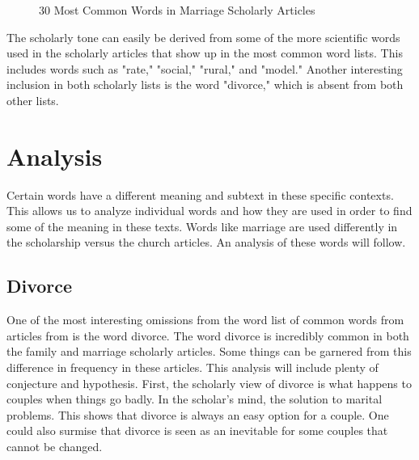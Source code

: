 \documentclass[twocolumn]{article}
\begin{document}
\begin{figure}[h]
    \centering
    \caption{30 Most Common Words in Marriage Scholarly Articles}
    \label{fig:mswc}
\end{figure}

The scholarly tone can easily be derived from some of the more scientific words used in the scholarly articles that show up in the most common word lists. This includes words such as "rate," "social," "rural," and "model." Another interesting inclusion in both scholarly lists is the word "divorce," which is absent from both other lists.

\section{Analysis}

Certain words have a different meaning and subtext in these specific contexts. This allows us to analyze individual words and how they are used in order to find some of the meaning in these texts. Words like marriage are used differently in the scholarship versus the church articles. An analysis of these words will follow.
\subsection{Divorce}

One of the most interesting omissions from the word list of common words from articles from \church is the word divorce. The word divorce is incredibly common in both the family and marriage scholarly articles. Some things can be garnered from this difference in frequency in these articles. This analysis will include plenty of conjecture and hypothesis. First, the scholarly view of divorce is what happens to couples when things go badly. In the scholar's mind, the solution to marital problems. This shows that divorce is always an easy option for a couple. One could also surmise that divorce is seen as an inevitable for some couples that cannot be changed.
\end{document}
